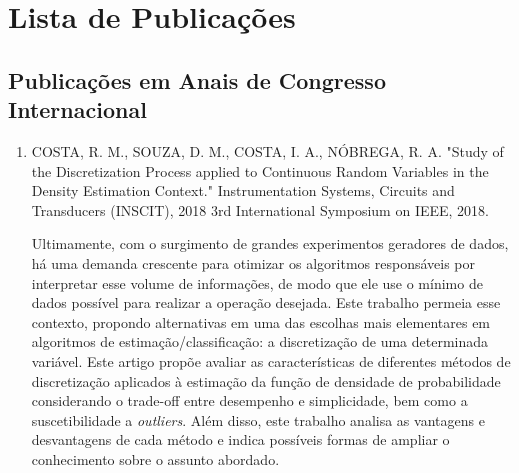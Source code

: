 %
%

\chapter{Lista de Publicações}\label{sec:apendicePubli}
\vspace{-2cm}

\section{Publicações em Anais de Congresso Internacional}

\begin{enumerate}

\item  COSTA, R. M., SOUZA, D. M., COSTA, I. A., NÓBREGA, R. A. "Study of the Discretization Process applied to Continuous Random Variables in the Density Estimation Context." Instrumentation Systems, Circuits and Transducers (INSCIT), 2018 3rd International Symposium on IEEE, 2018.

Ultimamente, com o surgimento de grandes experimentos geradores de dados, há uma demanda crescente para otimizar os algoritmos responsáveis por interpretar esse volume de informações, de modo que ele use o mínimo de dados possível para realizar a operação desejada. Este trabalho permeia esse contexto, propondo alternativas em uma das escolhas mais elementares em algoritmos de estimação/classificação: a discretização de uma determinada variável. Este artigo propõe avaliar as características de diferentes métodos de discretização aplicados à estimação da função de densidade de probabilidade considerando o trade-off entre desempenho e simplicidade, bem como a suscetibilidade a \textit{outliers}. Além disso, este trabalho analisa as vantagens e desvantagens de cada método e indica possíveis formas de ampliar o conhecimento sobre o assunto abordado.

\end{enumerate}

